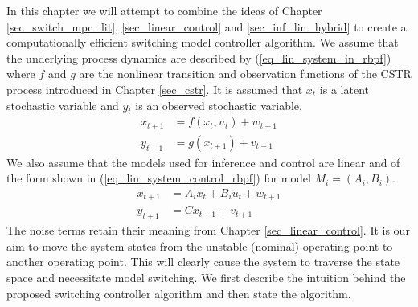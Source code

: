 In this chapter we will attempt to combine the ideas of Chapter \ref{sec_switch_mpc_lit}, \ref{sec_linear_control} and \ref{sec_inf_lin_hybrid} to create a computationally efficient switching model controller algorithm. We assume that the underlying process dynamics are described by (\ref{eq_lin_system_in_rbpf}) where $f$ and $g$ are the nonlinear transition and observation functions of the CSTR process introduced in Chapter \ref{sec_cstr}. It is assumed that $x_t$ is a latent stochastic variable and $y_t$ is an observed stochastic variable.
\begin{equation}
\begin{aligned}
x_{t+1} &= f(x_t, u_t) + w_{t+1}  \\
y_{t+1} &= g(x_{t+1}) + v_{t+1}  
\end{aligned}
\label{eq_lin_system_in_rbpf}
\end{equation}
We also assume that the models used for inference and control are linear and of the form shown in (\ref{eq_lin_system_control_rbpf}) for model $M_i=(A_i, B_i)$. 
\begin{equation}
\begin{aligned}
x_{t+1} &= A_ix_t + B_iu_t + w_{t+1} \\
y_{t+1} &= Cx_{t+1} + v_{t+1} 
\end{aligned}
\label{eq_lin_system_control_rbpf}
\end{equation}
The noise terms retain their meaning from Chapter \ref{sec_linear_control}. It is our aim to move the system states from the  unstable (nominal) operating point to another operating point. This will clearly cause the system to traverse the state space and necessitate model switching. We first describe the intuition behind the proposed switching controller algorithm and then state the algorithm.

